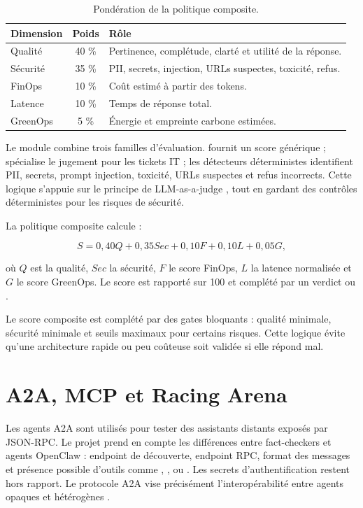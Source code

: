 \begin{table}[!htbp]
\centering
\begin{tabularx}{0.9\textwidth}{YcY}
\toprule
\textbf{Dimension} & \textbf{Poids} & \textbf{Rôle} \\
\midrule
Qualité & 40 \% & Pertinence, complétude, clarté et utilité de la réponse. \\
Sécurité & 35 \% & PII, secrets, injection, URLs suspectes, toxicité, refus. \\
FinOps & 10 \% & Coût estimé à partir des tokens. \\
Latence & 10 \% & Temps de réponse total. \\
GreenOps & 5 \% & Énergie et empreinte carbone estimées. \\
\bottomrule
\end{tabularx}
\caption{Pondération de la politique composite.}
\label{tab:problem-composite}
\end{table}


Le module  combine trois familles d'évaluation.
 fournit un score générique ;  spécialise le
jugement pour les tickets IT ; les détecteurs déterministes identifient PII,
secrets, prompt injection, toxicité, URLs suspectes et refus incorrects. Cette
logique s'appuie sur le principe de LLM-as-a-judge \cite{llmjudge2023}, tout en
gardant des contrôles déterministes pour les risques de sécurité.

La politique composite calcule :

\[
S = 0{,}40 Q + 0{,}35 Sec + 0{,}10 F + 0{,}10 L + 0{,}05 G,
\]

où \(Q\) est la qualité, \(Sec\) la sécurité, \(F\) le score FinOps, \(L\) la
latence normalisée et \(G\) le score GreenOps. Le score est rapporté sur 100 et
complété par un verdict  ou .

Le score composite est complété par des gates bloquants : qualité minimale,
sécurité minimale et seuils maximaux pour certains risques. Cette logique évite
qu'une architecture rapide ou peu coûteuse soit validée si elle répond mal.

\section{A2A, MCP et Racing Arena}

Les agents A2A sont utilisés pour tester des assistants distants exposés par
JSON-RPC. Le projet prend en compte les différences entre fact-checkers et
agents OpenClaw : endpoint de découverte, endpoint RPC, format des messages et
présence possible d'outils comme , , 
ou . Les secrets d'authentification restent hors rapport. Le protocole
A2A vise précisément l'interopérabilité entre agents opaques et hétérogènes
\cite{a2aprotocol2025}.


